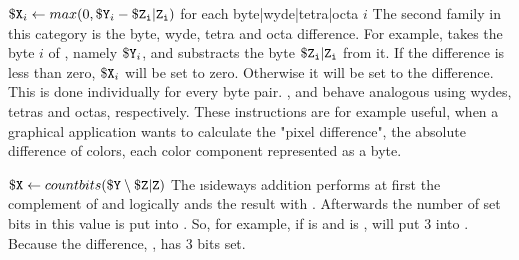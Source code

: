 \instrtbl
	{}
	{${\tt \$X}_i \leftarrow max(0,{\tt \$Y}_i - {\tt \$Z_i}{\tt|Z_i})$ for each byte|wyde|tetra|octa $i$}
\noindent The second family in this category is the byte, wyde, tetra and octa difference. For example,  takes the byte $i$ of , namely ${\tt \$Y}_i$, and substracts the byte ${\tt \$Z_i}{\tt|Z_i}$ from it. If the difference is less than zero, ${\tt \$X}_i$ will be set to zero. Otherwise it will be set to the difference. This is done individually for every byte pair. ,  and  behave analogous using wydes, tetras and octas, respectively. These instructions are for example useful, when a graphical application wants to calculate the "pixel difference", \ie the absolute difference of colors, each color component represented as a byte. \citep[pg. 8]{mmix-doc}

\instrtbl
	{}
	{${\tt \$X} \leftarrow countbits({\tt \$Y} \setminus {\tt \$Z}{\tt|Z})$}
\noindent The \i{sideways addition}  performs at first the complement of  and logically ands the result with . Afterwards the number of set bits in this value is put into . \citep[pg. 9]{mmix-doc} So, for example, if  is  and  is ,  will put 3 into . Because the difference, , has 3 bits set.

